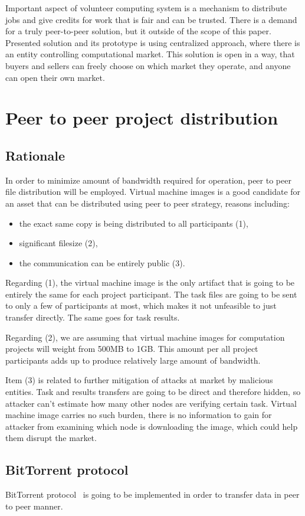 Important aspect of volunteer computing system is a mechanism to distribute jobs and give credits for work that is fair and can be trusted. There is a demand for a truly peer-to-peer solution, but it outside of the scope of this paper. Presented solution and its prototype is using centralized approach, where there is an entity controlling computational market. This solution is open in a way, that buyers and sellers can freely choose on which market they operate, and anyone can open their own market.

\section{Peer to peer project distribution}
\label{sec:p2p_projects}

\subsection{Rationale}

In order to minimize amount of bandwidth required for operation, peer to peer file distribution will be employed. Virtual machine images is a good candidate for an asset that can be distributed using peer to peer strategy, reasons including:
\begin{itemize}
	\item the exact same copy is being distributed to all participants (1),
	\item significant filesize (2),
	\item the communication can be entirely public (3).
\end{itemize}

Regarding (1), the virtual machine image is the only artifact that is going to be entirely the same for each project participant. The task files are going to be sent to only a few of participants at most, which makes it not unfeasible to just transfer directly. The same goes for task results.

Regarding (2), we are assuming that virtual machine images for computation projects will weight from 500MB to 1GB. This amount per all project participants adds up to produce relatively large amount of bandwidth.

Item (3) is related to further mitigation of attacks at market by malicious entities. Task and results transfers are going to be direct and therefore hidden, so attacker can't estimate how many other nodes are verifying certain task. Virtual machine image carries no such burden, there is no information to gain for attacker from examining which node is downloading the image, which could help them disrupt the market.

\subsection{BitTorrent protocol}

BitTorrent protocol~\cite{cohen2008bittorrent} is going to be implemented in order to transfer data in peer to peer manner.
